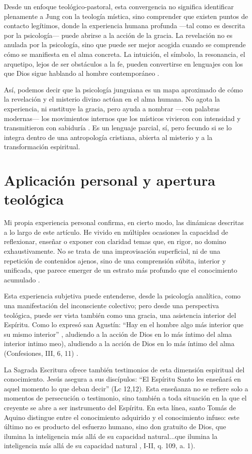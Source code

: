 Desde un enfoque teológico-pastoral, esta convergencia no significa identificar plenamente a Jung con la teología mística, sino comprender que existen puntos de contacto legítimos, donde la experiencia humana profunda —tal como es descrita por la psicología— puede abrirse a la acción de la gracia. La revelación no es anulada por la psicología, sino que puede ser mejor acogida cuando se comprende cómo se manifiesta en el alma concreta. La intuición, el símbolo, la resonancia, el arquetipo, lejos de ser obstáculos a la fe, pueden convertirse en lenguajes con los que Dios sigue hablando al hombre contemporáneo \cite{jung1959,jung1964}.

Así, podemos decir que la psicología junguiana es un mapa aproximado de cómo la revelación y el misterio divino actúan en el alma humana. No agota la experiencia, ni sustituye la gracia, pero ayuda a nombrar —con palabras modernas— los movimientos internos que los místicos vivieron con intensidad y transmitieron con sabiduría \cite{jung1959,jung1964}. Es un lenguaje parcial, sí, pero fecundo si se lo integra dentro de una antropología cristiana, abierta al misterio y a la transformación espiritual.

\section*{Aplicación personal y apertura teológica}

Mi propia experiencia personal confirma, en cierto modo, las dinámicas descritas a lo largo de este artículo. He vivido en múltiples ocasiones la capacidad de reflexionar, enseñar o exponer con claridad temas que, en rigor, no domino exhaustivamente. No se trata de una improvisación superficial, ni de una repetición de contenidos ajenos, sino de una comprensión súbita, interior y unificada, que parece emerger de un estrato más profundo que el conocimiento acumulado \cite{jung1959}.

Esta experiencia subjetiva puede entenderse, desde la psicología analítica, como una manifestación del inconsciente colectivo; pero desde una perspectiva teológica, puede ser vista también como una gracia, una asistencia interior del Espíritu. Como lo expresó san Agustín: “Hay en el hombre algo más interior que su mismo interior” , aludiendo a la acción de Dios en lo más íntimo del alma \cite{agustinconf}
{interior intimo meo}), aludiendo a la acción de Dios en lo más íntimo del alma (Confesiones, III, 6, 11) \cite{jung1959}.


La Sagrada Escritura ofrece también testimonios de esta dimensión espiritual del conocimiento. Jesús asegura a sus discípulos: “El Espíritu Santo les enseñará en aquel momento lo que deban decir” (Lc 12,12). Esta enseñanza no se refiere solo a momentos de persecución o testimonio, sino también a toda situación en la que el creyente se abre a ser instrumento del Espíritu. En esta línea, santo Tomás de Aquino distingue entre el conocimiento adquirido y el conocimiento infuso: este último no es producto del esfuerzo humano, sino don gratuito de Dios, que ilumina la inteligencia más allá de su capacidad natural...que ilumina la inteligencia más allá de su capacidad natural \cite{sto2006}, I-II, q. 109, a. 1).

